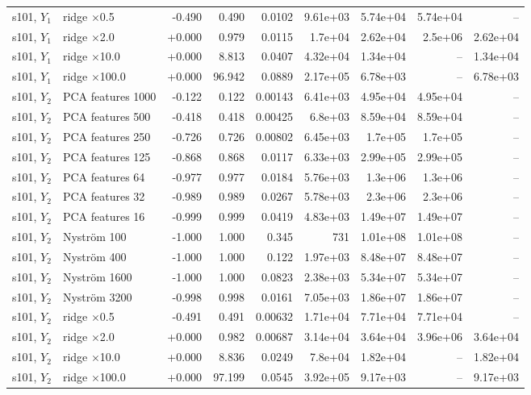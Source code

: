 \begin{landscape}
{\begin{longtable}{llrrrrrrr}
s101, $Y_1$ & ridge $\times$0.5 & -0.490 & 0.490 & 0.0102 & 9.61e+03 & 5.74e+04 & 5.74e+04 & -- \\
s101, $Y_1$ & ridge $\times$2.0 & +0.000 & 0.979 & 0.0115 & 1.7e+04 & 2.62e+04 & 2.5e+06 & 2.62e+04 \\
s101, $Y_1$ & ridge $\times$10.0 & +0.000 & 8.813 & 0.0407 & 4.32e+04 & 1.34e+04 & -- & 1.34e+04 \\
s101, $Y_1$ & ridge $\times$100.0 & +0.000 & 96.942 & 0.0889 & 2.17e+05 & 6.78e+03 & -- & 6.78e+03 \\
s101, $Y_2$ & PCA features 1000 & -0.122 & 0.122 & 0.00143 & 6.41e+03 & 4.95e+04 & 4.95e+04 & -- \\
s101, $Y_2$ & PCA features 500 & -0.418 & 0.418 & 0.00425 & 6.8e+03 & 8.59e+04 & 8.59e+04 & -- \\
s101, $Y_2$ & PCA features 250 & -0.726 & 0.726 & 0.00802 & 6.45e+03 & 1.7e+05 & 1.7e+05 & -- \\
s101, $Y_2$ & PCA features 125 & -0.868 & 0.868 & 0.0117 & 6.33e+03 & 2.99e+05 & 2.99e+05 & -- \\
s101, $Y_2$ & PCA features 64 & -0.977 & 0.977 & 0.0184 & 5.76e+03 & 1.3e+06 & 1.3e+06 & -- \\
s101, $Y_2$ & PCA features 32 & -0.989 & 0.989 & 0.0267 & 5.78e+03 & 2.3e+06 & 2.3e+06 & -- \\
s101, $Y_2$ & PCA features 16 & -0.999 & 0.999 & 0.0419 & 4.83e+03 & 1.49e+07 & 1.49e+07 & -- \\
s101, $Y_2$ & Nystr\"om 100 & -1.000 & 1.000 & 0.345 & 731 & 1.01e+08 & 1.01e+08 & -- \\
s101, $Y_2$ & Nystr\"om 400 & -1.000 & 1.000 & 0.122 & 1.97e+03 & 8.48e+07 & 8.48e+07 & -- \\
s101, $Y_2$ & Nystr\"om 1600 & -1.000 & 1.000 & 0.0823 & 2.38e+03 & 5.34e+07 & 5.34e+07 & -- \\
s101, $Y_2$ & Nystr\"om 3200 & -0.998 & 0.998 & 0.0161 & 7.05e+03 & 1.86e+07 & 1.86e+07 & -- \\
s101, $Y_2$ & ridge $\times$0.5 & -0.491 & 0.491 & 0.00632 & 1.71e+04 & 7.71e+04 & 7.71e+04 & -- \\
s101, $Y_2$ & ridge $\times$2.0 & +0.000 & 0.982 & 0.00687 & 3.14e+04 & 3.64e+04 & 3.96e+06 & 3.64e+04 \\
s101, $Y_2$ & ridge $\times$10.0 & +0.000 & 8.836 & 0.0249 & 7.8e+04 & 1.82e+04 & -- & 1.82e+04 \\
s101, $Y_2$ & ridge $\times$100.0 & +0.000 & 97.199 & 0.0545 & 3.92e+05 & 9.17e+03 & -- & 9.17e+03 \\

\end{longtable}}
\end{landscape}
